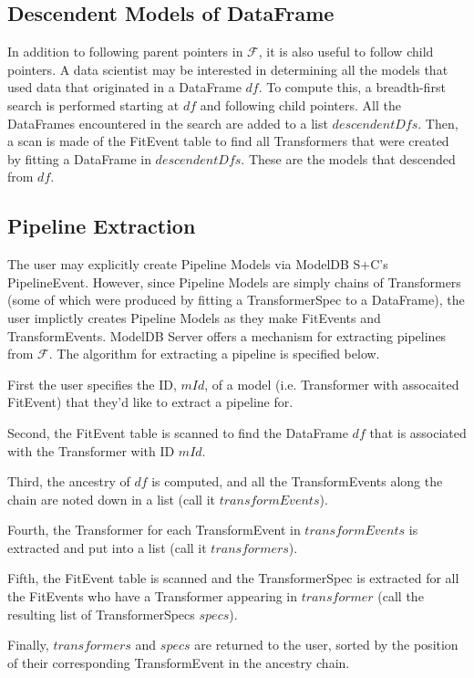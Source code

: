 \subsection{Descendent Models of DataFrame}
In addition to following parent pointers in $\mathcal{F}$, it is also useful to follow child pointers. A data scientist
may be interested in determining all the models that used data that originated in a DataFrame $df$. To compute this,
a breadth-first search is performed starting at $df$ and following child pointers. All the DataFrames encountered in 
the search are added to a list $descendentDfs$. Then, a scan is made of the FitEvent table to find all Transformers that
were created by fitting a DataFrame in $descendentDfs$. These are the models that descended from $df$.

\subsection{Pipeline Extraction}
The user may explicitly create Pipeline Models via ModelDB S+C's PipelineEvent. However, since Pipeline Models are 
simply chains of Transformers (some of which were produced by fitting a TransformerSpec to a DataFrame),
the user implictly creates Pipeline Models as they make FitEvents and TransformEvents. ModelDB Server offers a mechanism
for extracting pipelines from $\mathcal{F}$. The algorithm for extracting a pipeline is specified below.

First the user specifies the ID, $mId$, of a model (i.e. Transformer with assocaited FitEvent) that they'd like to extract
a pipeline for.

Second, the FitEvent table is scanned to find the DataFrame $df$ that is associated with the Transformer with ID $mId$.

Third, the ancestry of $df$ is computed, and all the TransformEvents along the chain are noted down in a list (call it $transformEvents$).

Fourth, the Transformer for each TransformEvent in $transformEvents$ is extracted and put into a list (call it $transformers$).

Fifth, the FitEvent table is scanned and the TransformerSpec is extracted for all the FitEvents who have a Transformer appearing in $transformer$ 
(call the resulting list of TransformerSpecs $specs$).

Finally, $transformers$ and $specs$ are returned to the user, sorted by the position of their corresponding TransformEvent in the ancestry chain.

